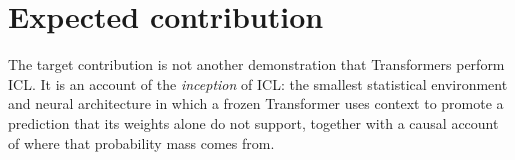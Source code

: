 \documentclass[10pt]{article}
\begin{document}
\section{Expected contribution}
The target contribution is not another demonstration that Transformers perform ICL. It is an account of the \emph{inception} of ICL: the smallest statistical environment and neural architecture in which a frozen Transformer uses context to promote a prediction that its weights alone do not support, together with a causal account of where that probability mass comes from.
\end{document}
